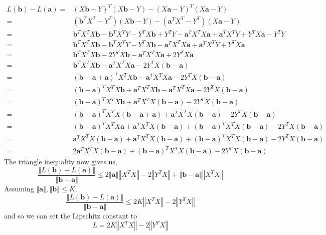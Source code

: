 \documentclass{article}
\begin{document}
\[
    \begin{aligned}
			L(\textbf{b}) - L(\textbf{a}) =& \left( X\textbf{b} - Y \right)^T (X\textbf{b} - Y) - (X\textbf{a} - Y)^T (X\textbf{a} - Y) \\
			=& (\textbf{b}^T X^T - Y^T)(X\textbf{b} - Y) - (\textbf{a}^T X^T - Y^T)(X\textbf{a} - Y) \\
			=& \textbf{b}^T X^T X \textbf{b} - \textbf{b}^T X^T Y - Y^T X\textbf{b} + Y^T Y - \textbf{a}^T X^T X\textbf{a} + \textbf{a}^T X^T Y + Y^T X\textbf{a} - Y^T Y \\
			=& \textbf{b}^T X^T X \textbf{b} - \textbf{b}^T X^T Y - Y^T X\textbf{b} - \textbf{a}^T X^T X\textbf{a} + \textbf{a}^T X^T Y + Y^T X\textbf{a} \\
			=& \textbf{b}^T X^T X \textbf{b} - 2Y^T X\textbf{b} - \textbf{a}^T X^T X\textbf{a} + 2Y^T X\textbf{a} \\
			=& \textbf{b}^T X^T X \textbf{b} - \textbf{a}^T X^T X\textbf{a} - 2Y^T X(\textbf{b} - \textbf{a}) \\
			=& (\textbf{b} - \textbf{a} + \textbf{a})^T X^T X \textbf{b} - \textbf{a}^T X^T X\textbf{a} - 2Y^T X(\textbf{b} - \textbf{a}) \\
			=& (\textbf{b} - \textbf{a})^T X^T X \textbf{b} + \textbf{a}^T X^T X \textbf{b} - \textbf{a}^T X^T X\textbf{a} - 2Y^T X(\textbf{b} - \textbf{a}) \\
			=& (\textbf{b} - \textbf{a})^T X^T X \textbf{b} + \textbf{a}^T X^T X (\textbf{b} - \textbf{a}) - 2Y^T X(\textbf{b} - \textbf{a}) \\
			=& (\textbf{b} - \textbf{a})^T X^T X (\textbf{b} - \textbf{a} + \textbf{a}) + \textbf{a}^T X^T X (\textbf{b} - \textbf{a}) - 2Y^T X(\textbf{b} - \textbf{a}) \\
			=& (\textbf{b} - \textbf{a})^T X^T X\textbf{a} + \textbf{a}^T X^T X(\textbf{b} - \textbf{a}) + (\textbf{b} - \textbf{a})^T X^T X(\textbf{b} - \textbf{a}) - 2Y^T X(\textbf{b} - \textbf{a}) \\
			=& \textbf{a}^T X^T X (\textbf{b} - \textbf{a}) + \textbf{a}^T X^T X(\textbf{b} - \textbf{a}) + (\textbf{b} - \textbf{a})^T X^T X(\textbf{b} - \textbf{a}) - 2Y^T X(\textbf{b} - \textbf{a}) \\
			=& 2\textbf{a}^T X^T X(\textbf{b} - \textbf{a}) + (\textbf{b} - \textbf{a})^T X^T X(\textbf{b} - \textbf{a}) - 2Y^T X(\textbf{b} - \textbf{a})
		\end{aligned}
\]
The triangle inequality now gives us,
\[
    \frac{\left\Vert L(\textbf{b}) - L(\textbf{a}) \right\Vert}{\left\Vert \textbf{b} - \textbf{a} \right\Vert} \leq 2 \left\Vert \textbf{a} \right\Vert \left\Vert X^T X \right\Vert - 2\left\Vert Y^T X \right\Vert + \left\Vert \textbf{b} - \textbf{a} \right\Vert \left\Vert X^T X \right\Vert
\]
Assuming $\left\Vert \textbf{a} \right\Vert, \left\Vert \textbf{b} \right\Vert \leq K$,
\[
    \frac{\left\Vert L(\textbf{b}) - L(\textbf{a}) \right\Vert}{\left\Vert \textbf{b} - \textbf{a} \right\Vert} \leq 2K \left\Vert X^T X \right\Vert - 2 \left\Vert Y^T X \right\Vert
\]
and so we can set the Lipschitz constant to
\[
    \boxed{
        L = 2K \left\Vert X^T X \right\Vert - 2 \left\Vert Y^T X \right\Vert
    }
\]
\end{document}
